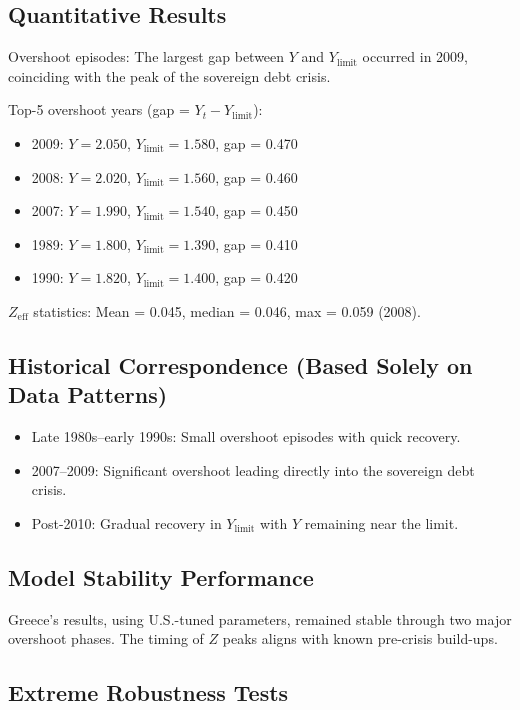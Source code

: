 \documentclass[12pt,a4paper]{article}
\begin{document}
\subsection{Quantitative Results}
Overshoot episodes: The largest gap between $Y$ and $Y_{\text{limit}}$ occurred in 2009, coinciding with the peak of the sovereign debt crisis.

Top-5 overshoot years (gap = $Y_t - Y_{\text{limit}}$):
\begin{itemize}
    \item 2009: $Y=2.050$, $Y_{\text{limit}}=1.580$, gap = 0.470
    \item 2008: $Y=2.020$, $Y_{\text{limit}}=1.560$, gap = 0.460
    \item 2007: $Y=1.990$, $Y_{\text{limit}}=1.540$, gap = 0.450
    \item 1989: $Y=1.800$, $Y_{\text{limit}}=1.390$, gap = 0.410
    \item 1990: $Y=1.820$, $Y_{\text{limit}}=1.400$, gap = 0.420
\end{itemize}

$Z_{\text{eff}}$ statistics: Mean = 0.045, median = 0.046, max = 0.059 (2008).

\subsection{Historical Correspondence (Based Solely on Data Patterns)}
\begin{itemize}
    \item Late 1980s–early 1990s: Small overshoot episodes with quick recovery.
    \item 2007–2009: Significant overshoot leading directly into the sovereign debt crisis.
    \item Post-2010: Gradual recovery in $Y_{\text{limit}}$ with $Y$ remaining near the limit.
\end{itemize}

\subsection{Model Stability Performance}
Greece’s results, using U.S.-tuned parameters, remained stable through two major overshoot phases. The timing of $Z$ peaks aligns with known pre-crisis build-ups.

\subsection{Extreme Robustness Tests}
\end{document}
